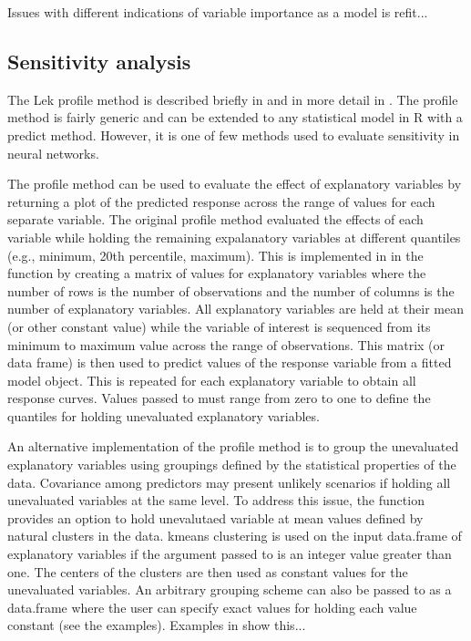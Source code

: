 \documentclass[article]{jss}\usepackage[]{graphicx}\usepackage[]{color}
\begin{document}
Issues with different indications of variable importance as a model is refit...

\subsection{Sensitivity analysis}

The Lek profile method is described briefly in \citet{Lek96} and in more detail in \citet{Gevrey03}. The profile method is fairly generic and can be extended to any statistical model in R with a predict method. However, it is one of few methods used to evaluate sensitivity in neural networks.

The profile method can be used to evaluate the effect of explanatory variables by returning a plot of the predicted response across the range of values for each separate variable. The original profile method evaluated the effects of each variable while holding the remaining expalanatory variables at different quantiles (e.g., minimum, 20th percentile, maximum). This is implemented in in the function by creating a matrix of values for explanatory variables where the number of rows is the number of observations and the number of columns is the number of explanatory variables. All explanatory variables are held at their mean (or other constant value) while the variable of interest is sequenced from its minimum to maximum value across the range of observations. This matrix (or data frame) is then used to predict values of the response variable from a fitted model object. This is repeated for each explanatory variable to obtain all response curves. Values passed to  must range from zero to one to define the quantiles for holding unevaluated explanatory variables.

An alternative implementation of the profile method is to group the unevaluated explanatory variables using groupings defined by the statistical properties of the data. Covariance among predictors may present unlikely scenarios if holding all unevaluated variables at the same level. To address this issue, the function provides an option to hold unevalutaed variable at mean values defined by natural clusters in the data. kmeans clustering is used on the input data.frame of explanatory variables if the argument passed to  is an integer value greater than one. The centers of the clusters are then used as constant values for the unevaluated variables. An arbitrary grouping scheme can also be passed to  as a data.frame where the user can specify exact values for holding each value constant (see the examples).  Examples in \citet{Beck14a} show this...
\end{document}
